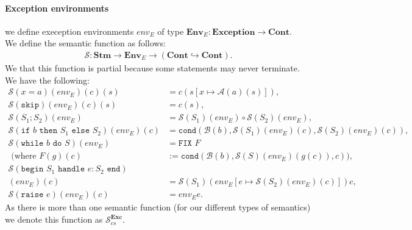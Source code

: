 \paragraph{Exception environments} we define exeception environments
$env_E$ of type \newline 
$\textbf{Env}_E : \textbf{Exception} \to \textbf{Cont}$.
\\[\baselineskip]
We define the semantic function as follows: \begin{gather*}
  \mathcal{S}: \textbf{Stm} \to \textbf{Env}_E 
  \to (\textbf{Cont} \hookrightarrow \textbf{Cont}).
\end{gather*} We that this function is partial because some statements
may never terminate. We have the following: \begin{align*}
  \mathcal{S}(x = a)(env_E)(c)(s) &= c(s[x \mapsto \mathcal{A}(a)(s)]), \\
  \mathcal{S}(\texttt{skip})(env_E)(c)(s) &= c(s), \\
  \mathcal{S}(S_1 ; S_2)(env_E) &= \mathcal{S}(S_1)(env_E) \circ \mathcal{S}(S_2)(env_E), \\
  \mathcal{S}(\texttt{if } b \texttt{ then } S_1 \texttt{ else } S_2)(env_E)(c)
  &= \texttt{cond}(\mathcal{B}(b), \mathcal{S}(S_1)(env_E)(c), \mathcal{S}(S_2)(env_E)(c)), \\
  \mathcal{S}(\texttt{while } b \texttt{ do } S)(env_E)
  &= \texttt{FIX } F \\
  \text{ (where } F(g)(c) &
  := \texttt{cond}(\mathcal{B}(b), \mathcal{S}(S)(env_E)(g(c)), c)), \\
  \mathcal{S}(\texttt{begin } S_1 \texttt{ handle } e: S_2 \texttt{ end}) \\
  (env_E)(c) &= \mathcal{S}(S_1)(env_E[e \mapsto \mathcal{S}(S_2)(env_E)(c)]) c, \\
  \mathcal{S}(\texttt{raise } e)(env_E)(c) &= env_E e.
\end{align*} 
As there is more than one semantic function (for our different types
of semantics) we denote this function as $\mathcal{S}_{cs}^{\textbf{Exc}}$.